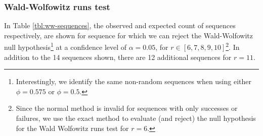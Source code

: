\documentclass{article}
\begin{document}
\hypertarget{wald-wolfowitz-runs-test-1}{%
\subsubsection{Wald-Wolfowitz runs
test}\label{wald-wolfowitz-runs-test-1}}

In Table \ref{tbl:ww-sequences}, the observed and expected count of
sequences respectively, are shown for sequence for which we can reject
the Wald-Wolfowitz null hypothesis\footnote{Interestingly, we identify
  the same non-random sequences when using either \(\phi = 0.575\) or
  \(\phi = 0.5\).} at a confidence level of \(\alpha = 0.05\), for
\(r \in [6, 7, 8, 9, 10]\)\footnote{Since the normal method is invalid
  for sequences with only successes or failures, we use the exact method
  to evaluate (and reject) the null hypothesis for the Wald Wolfowitz
  runs test for \(r = 6\).}. In addition to the 14 sequences shown,
there are 12 additional sequences for \(r = 11\).
\end{document}
